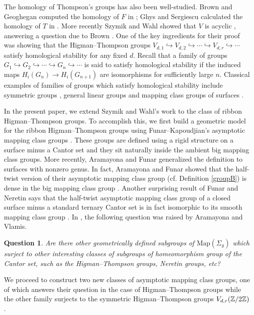 \documentclass[11pt, a4paper]{amsart}
\newtheorem*{ques*}{Question}
\theoremstyle{definition}
\begin{document}
The homology of Thompson's groups has also been well-studied.  Brown and Geoghegan computed the homology of $F$ in \cite{BG84}; Ghys and Sergiescu calculated the homology of $T$ in \cite{GS87}. More recently Szymik and Wahl showed that  $V$ is acyclic \cite{SW19}, answering a question due to Brown \cite{Bro89}. One of the key ingredients for their proof was showing that the Higman--Thompson groups $V_{d,1}\hookrightarrow V_{d,2}\hookrightarrow \cdots \hookrightarrow V_{d,r} \hookrightarrow \cdots$ satisfy homological stability for any fixed $d$. Recall that a family of groups 
$G_1\hookrightarrow G_2 \hookrightarrow \cdots \hookrightarrow G_n \hookrightarrow \cdots$
is said to satisfy homological stability if the induced maps $H_i(G_n)\rightarrow H_i(G_{n+1})$ are isomorphisms for sufficiently large $n$.  Classical examples of families of groups which satisfy homological stability include symmetric groups \cite{Nak61}, general linear groups \cite{vdK80} and mapping class groups of surfaces \cite{Har85}.  


In the present paper, we extend  Szymik and Wahl's work to the class of ribbon Higman--Thompson groups. To accomplish this, we first build a geometric model for the ribbon Higman--Thompson groups using Funar--Kapoudjian's asymptotic mapping class groups \cite{FK04}. These groups are defined using a rigid structure on a surface minus a Cantor set and they sit naturally inside the ambient big mapping class groups. More recently, Aramayona and Funar \cite{AF17} generalized the definition to surfaces with nonzero genus.  In fact, Aramayona and Funar showed that the half-twist version of their asymptotic mapping class group (cf. Definition \ref{groupB}) is dense in the big mapping class group \cite[Theorem 1.3]{AF17}. Another surprising result of Funar and  Neretin says that the half-twist asymptotic mapping class group of a closed surface minus a standard ternary Cantor set is in fact isomorphic to its smooth mapping class group    \cite[Corollary 2]{FN18}.  In \cite[Question 5.37]{AV20}, the  following question was raised by Aramayona and Vlamis.

\begin{ques*}
Are there other geometrically defined subgroups of $\text{Map}(\Sigma_g)$ which surject to other interesting classes of subgroups of homeomorphism group of the Cantor set, such as the Higman--Thompson groups, Neretin groups, etc?
\end{ques*}

We proceed to construct two new classes of asymptotic mapping class groups, one of which answers their question in the case of Higman--Thompson groups while the other family surjects to the symmetric Higman--Thompson groups $V_{d,r}({\mathbb {Z}}/2{\mathbb {Z}})$.
\end{document}
